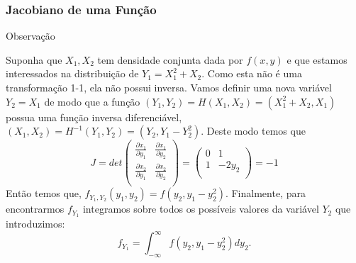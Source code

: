 \begin{frame}
\frametitle{\textbf{Jacobiano de uma Função}}
\baselineskip=13pt
\begin{block}{Observação}

\begin{exem}
Suponha que $X_1,X_2$ tem densidade conjunta dada por $f(x,y)$ e que estamos interessados na distribuição de $Y_1=X_1^2+X_2$. Como esta não é uma transformação 1-1, ela não possui inversa. Vamos definir uma nova variável $Y_2=X_1$ de modo que a função $(Y_1,Y_2)=H(X_1,X_2)=(X_1^2+X_2,X_1)$ possua uma função inversa diferenciável, $(X_1,X_2)=H^{-1}(Y_1,Y_2)=(Y_2,Y_1-Y_2^2)$. Deste modo temos que
$$J=det\left(
\begin{array}{cc}
\frac{\partial x_1}{\partial y_1} & \frac{\partial x_1}{\partial y_2} \\
\frac{\partial x_2}{\partial y_1} & \frac{\partial x_2}{\partial y_2}  \\

\end{array}
\right)=
\left(
\begin{array}{cc}
0 & 1 \\
1 & -2y_2 \\
\end{array}
\right)=-1
$$
Então temos que, $f_{Y_1,Y_2}(y_1,y_2)=f(y_2,y_1-y_2^2)$. Finalmente, para encontrarmos $f_{Y_1}$ integramos sobre todos os possíveis valores da variável $Y_2$ que introduzimos:
$$f_{Y_1}=\int_{-\infty}^{\infty}f(y_2,y_1-y_2^2)dy_2.$$
\end{exem}


\end{block}
\end{frame}

